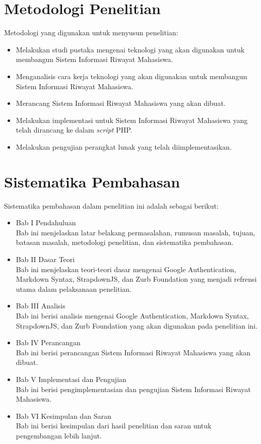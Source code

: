 \section{Metodologi Penelitian}
Metodologi yang digunakan untuk menyusun penelitian:
\begin{itemize}
	\item Melakukan studi pustaka mengenai teknologi yang akan digunakan untuk
	membangun Sistem Informasi Riwayat Mahasiswa.
	\item Menganalisis cara kerja teknologi yang akan digunakan untuk membangun
	Sistem Informasi Riwayat Mahasiswa.
	\item Merancang Sistem Informasi Riwayat Mahasiswa yang akan dibuat.
	\item Melakukan implementasi untuk Sistem Informasi Riwayat Mahasiswa yang
	telah dirancang ke dalam {\it script} PHP.
	\item Melakukan pengujian perangkat lunak yang telah diimplementasikan.
\end{itemize}

\section{Sistematika Pembahasan}
Sistematika pembahasan dalam penelitian ini adalah sebagai berikut:
\begin{itemize}
	\item Bab I Pendahuluan\\
	Bab ini menjelaskan latar belakang permasalahan, rumusan masalah, tujuan,
	batasan masalah, metodologi penelitian, dan sistematika pembahasan.
	\item Bab II Dasar Teori\\
	Bab ini menjelaskan teori-teori dasar mengenai Google Authentication, Markdown
	Syntax, StrapdownJS, dan Zurb Foundation yang menjadi refrensi utama dalam
	pelaksanaan penelitian.
	\item Bab III Analisis\\
	Bab ini berisi analisis mengenai Google Authentication, Markdown Syntax,
	StrapdownJS, dan Zurb Foundation yang akan digunakan pada penelitian ini.
	\item Bab IV Perancangan\\
	Bab ini berisi perancangan Sistem Informasi Riwayat Mahasiswa yang akan dibuat.
	\item Bab V Implementasi dan Pengujian\\
	Bab ini berisi pengimplementasian dan pengujian Sistem Informasi Riwayat
	Mahasiswa.
	\item Bab VI Kesimpulan dan Saran\\
	Bab ini berisi kesimpulan dari hasil penelitian dan saran untuk pengembangan
	lebih lanjut.
\end{itemize}